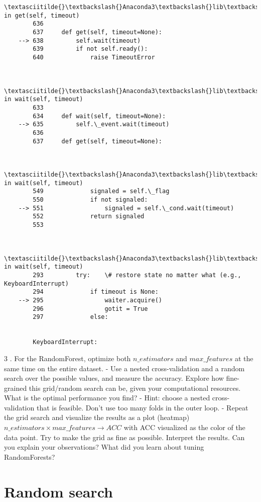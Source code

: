 \documentclass[11pt]{article}
\begin{document}
\begin{Verbatim}[commandchars=\\\{\}]
        \textasciitilde{}\textbackslash{}Anaconda3\textbackslash{}lib\textbackslash{}multiprocessing\textbackslash{}pool.py in get(self, timeout)
        636 
        637     def get(self, timeout=None):
    --> 638         self.wait(timeout)
        639         if not self.ready():
        640             raise TimeoutError
    

        \textasciitilde{}\textbackslash{}Anaconda3\textbackslash{}lib\textbackslash{}multiprocessing\textbackslash{}pool.py in wait(self, timeout)
        633 
        634     def wait(self, timeout=None):
    --> 635         self.\_event.wait(timeout)
        636 
        637     def get(self, timeout=None):
    

        \textasciitilde{}\textbackslash{}Anaconda3\textbackslash{}lib\textbackslash{}threading.py in wait(self, timeout)
        549             signaled = self.\_flag
        550             if not signaled:
    --> 551                 signaled = self.\_cond.wait(timeout)
        552             return signaled
        553 
    

        \textasciitilde{}\textbackslash{}Anaconda3\textbackslash{}lib\textbackslash{}threading.py in wait(self, timeout)
        293         try:    \# restore state no matter what (e.g., KeyboardInterrupt)
        294             if timeout is None:
    --> 295                 waiter.acquire()
        296                 gotit = True
        297             else:
    

        KeyboardInterrupt: 

    \end{Verbatim}

    3 . For the RandomForest, optimize both \(n\_estimators\) and
\(max\_features\) at the same time on the entire dataset. - Use a nested
cross-validation and a random search over the possible values, and
measure the accuracy. Explore how fine-grained this grid/random search
can be, given your computational resources. What is the optimal
performance you find? - Hint: choose a nested cross-validation that is
feasible. Don't use too many folds in the outer loop. - Repeat the grid
search and visualize the results as a plot (heatmap)
\(n\_estimators \times max\_features \rightarrow ACC\) with ACC
visualized as the color of the data point. Try to make the grid as fine
as possible. Interpret the results. Can you explain your observations?
What did you learn about tuning RandomForests?

    \section{Random search}\label{random-search}
\end{document}
